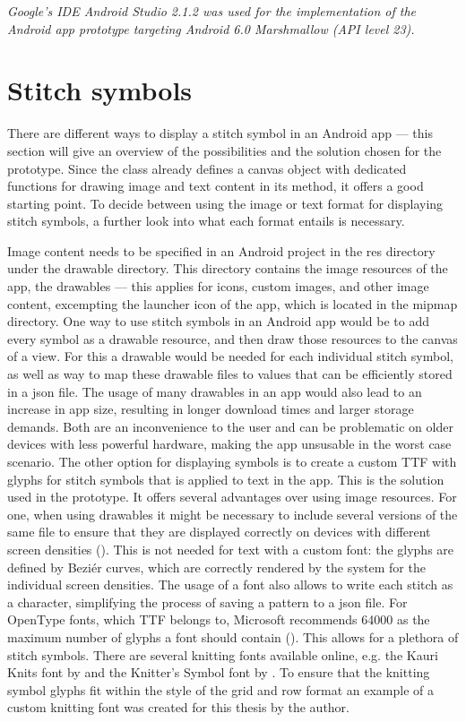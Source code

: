 \textit{Google’s IDE Android Studio 2.1.2 was used for the implementation of the Android app prototype targeting Android 6.0 Marshmallow (\gls{API} level 23).} 

\section{Stitch symbols}
There are different ways to display a stitch symbol in an Android app --- this section will give an overview of the possibilities and the solution chosen for the prototype. 
Since the  class already defines a canvas object with dedicated functions for drawing image and text content in its  method, it offers a good starting point. To decide between using the image or text format for displaying stitch symbols, a further look into what each format entails is necessary.

Image content needs to be specified in an Android project in the res directory under the drawable directory. This directory contains the image resources of the app, the drawables --- this applies for icons, custom images, and other image content, excempting the launcher icon of the app, which is located in the mipmap directory. One way to use stitch symbols in an Android app would be to add every symbol as a drawable resource, and then draw those resources to the canvas of a view. For this a drawable would be needed for each individual stitch symbol, as well as way to map these drawable files to values that can be efficiently stored in a \gls{json} file. The usage of many drawables in an app would also lead to an increase in app size, resulting in longer download times and larger storage demands. Both are an inconvenience to the user and can be problematic on older devices with less powerful hardware, making the app unsusable in the worst case scenario.
The other option for displaying symbols is to create a custom \gls{TTF} with glyphs for stitch symbols that is applied to text in the app. This is the solution used in the prototype. It offers several advantages over using image resources. For one, when using drawables it might be necessary to include several versions of the same file to ensure that they are displayed correctly on devices with different screen densities (\cite{android_screen_densities}). This is not needed for text with a custom font: the glyphs are defined by Beziér curves, which are correctly rendered by the system for the individual screen densities. The usage of a font also allows to write each stitch as a character, simplifying the process of saving a pattern to a \gls{json} file. For OpenType fonts, which \gls{TTF} belongs to, Microsoft recommends 64000 as the maximum number of glyphs a font should contain (\cite{microsoft_max_glyphs}). This allows for a plethora of stitch symbols. There are several knitting fonts available online, e.g. the Kauri Knits font by \cite{kauri} and the Knitter's Symbol font by \cite{xenakis}. To ensure that the knitting symbol glyphs fit within the style of the grid and row format an example of a custom knitting font was created for this thesis by the author.

